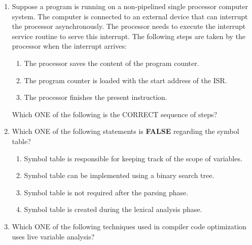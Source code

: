 \documentclass[a4paper, 11pt]{article}
\begin{document}
\begin{enumerate}
\begin{enumerate}
    \end{enumerate}
    \hfill{}
    \item Suppose a program is running on a non-pipelined single processor computer system. The computer is connected to an external device that can interrupt the processor asynchronously. The processor needs to execute the interrupt service routine  to serve this interrupt. The following steps  are taken by the processor when the interrupt arrives:
    \begin{enumerate}[label=\brak{\roman*}]
        \item The processor saves the content of the program counter.
        \item The program counter is loaded with the start address of the ISR.
        \item The processor finishes the present instruction.
    \end{enumerate}
    Which ONE of the following is the CORRECT sequence of steps?
    \begin{enumerate}
    \end{enumerate}
    \hfill{}
    \item Which ONE of the following statements is \textbf{FALSE} regarding the symbol table?
    \begin{enumerate}
        \item Symbol table is responsible for keeping track of the scope of variables.
        \item Symbol table can be implemented using a binary search tree.
        \item Symbol table is not required after the parsing phase.
        \item Symbol table is created during the lexical analysis phase.
    \end{enumerate}
    \hfill{}
    \item Which ONE of the following techniques used in compiler code optimization uses live variable analysis?

\end{enumerate}
\end{document}

